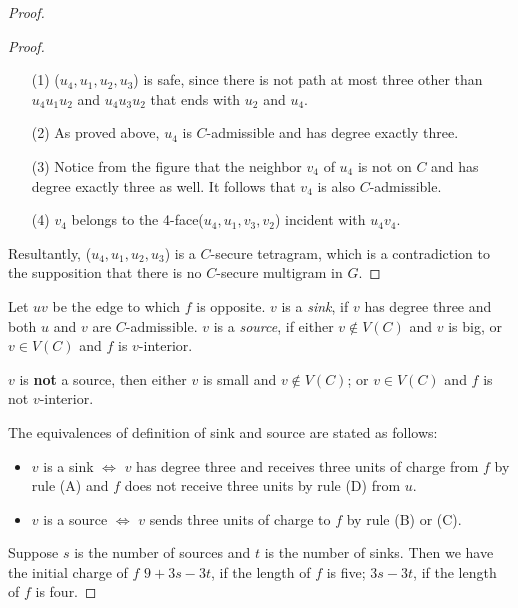 \begin{proof}
\begin{proof}
\begin{itemize}
    \item[(1)] ($u_4, u_1, u_2, u_3$) is safe, since there is not path at most three other than $u_4u_1u_2$ and $u_4u_3u_2$ that ends with $u_2$ and $u_4$. 
    \item[(2)] As proved above, $u_4$ is $C$-admissible and has degree exactly three.
    \item[(3)] Notice from the figure that the neighbor $v_4$ of $u_4$ is not on $C$ and has degree exactly three as well. It follows that $v_4$ is also $C$-admissible.
    \item[(4)] $v_4$ belongs to the 4-face($u_4, u_1, v_3, v_2$) incident with $u_4v_4$. 
\end{itemize}
Resultantly, ($u_4, u_1, u_2, u_3$) is a $C$-secure tetragram, which is a contradiction to the supposition that there is no $C$-secure multigram in $G$.
\end{proof}

\begin{definition}
Let $uv$ be the edge to which $f$ is opposite. $v$ is a \textit{sink}, if $v$ has degree three and both $u$ and $v$ are $C$-admissible. $v$ is a \textit{source}, if either $v \notin V(C)$ and $v$ is big, or $v \in V(C)$ and $f$ is $v$-interior. \cite{dvorak2013threecoloring}
\end{definition}

\begin{observation}
$v$ is \textbf{not} a source, then either $v$ is small and $v \notin V(C)$; or $v \in V(C)$ and $f$ is not $v$-interior.
\end{observation}

\begin{observation}
The equivalences of definition of sink and source are stated as follows: \cite{dvorak2013threecoloring}
\begin{itemize}
    \item $v$ is a sink $\Longleftrightarrow$ $v$ has degree three and receives three units of charge from $f$ by rule (A) and $f$ does not receive three units by rule (D) from $u$.
    \item $v$ is a source $\Longleftrightarrow$ $v$ sends three units of charge to $f$ by rule (B) or (C).
\end{itemize}
\end{observation}
Suppose $s$ is the number of sources and $t$ is the number of sinks. Then we have the initial charge of $f$ $9 + 3s - 3t$, if the length of $f$ is five; $3s - 3t$, if the length of $f$ is four. 


\end{proof}
